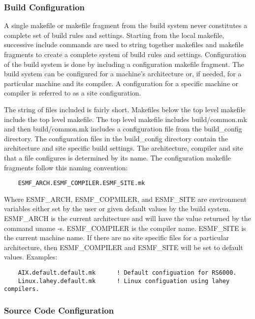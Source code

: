 \subsubsection{Build Configuration}

A single makefile or makefile fragment from the build system never
constitutes a complete set of build rules and settings.  Starting from
the local makefile, successive include commands are used to string
together makefiles and makefile fragments to create a complete system
of build rules and settings.  Configuration of the build system is
done by including a configuration makefile fragment.  The build
system can be configured for a machine's architecture or, if needed,
for a particular machine and its compiler. A configuration for a
specific machine or compiler is referred to as a site configuration.

The string of files included is fairly short.  Makefiles below the top
level makefile include the top level makefile. The top level makefile
includes build/common.mk and then build/common.mk includes a
configuration file from the build\_config directory.  The configuration
files in the build\_config directory contain the architecture and site
specific build settings.  The architecture, compiler and site that a file
configures is determined by its name.  The configuration makefile
fragments follow this naming convention:

\begin{verbatim}
    ESMF_ARCH.ESMF_COMPILER.ESMF_SITE.mk
\end{verbatim}

Where ESMF\_ARCH, ESMF\_COPMILER, and ESMF\_SITE are environment
variables either set by the user or given default values by the build
system. ESMF\_ARCH is the current architecture and will have the value
returned by the command uname -s.  ESMF\_COMPILER is the compiler
name.  ESMF\_SITE is the current machine name. If there are no site
specific files for a particular architecture, then ESMF\_COMPILER and
ESMF\_SITE will be set to default values.  Examples:

\begin{verbatim}
    AIX.default.default.mk      ! Default configuation for RS6000.
    Linux.lahey.default.mk      ! Linux configuation using lahey compilers.
\end{verbatim}

\subsubsection{Source Code Configuration}

